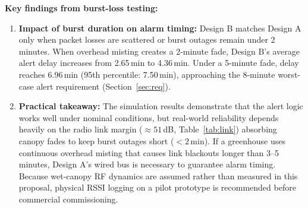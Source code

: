 \documentclass[11pt,a4paper]{report}
\begin{document}
\textbf{Key findings from burst-loss testing:}
\begin{enumerate}
  \item \textbf{Impact of burst duration on alarm timing:} Design B matches Design A only when packet losses are scattered or burst outages remain under 2 minutes. When overhead misting creates a 2-minute fade, Design B's average alert delay increases from 2.65\,min to 4.36\,min. Under a 5-minute fade, delay reaches 6.96\,min (95th percentile: 7.50\,min), approaching the 8-minute worst-case alert requirement (Section~\ref{sec:req}).
  \item \textbf{Practical takeaway:} The simulation results demonstrate that the alert logic works well under nominal conditions, but real-world reliability depends heavily on the radio link margin ($\approx 51$\,dB, Table~\ref{tab:link}) absorbing canopy fades to keep burst outages short ($<2$\,min). If a greenhouse uses continuous overhead misting that causes link blackouts longer than 3--5 minutes, Design A's wired bus is necessary to guarantee alarm timing. Because wet-canopy RF dynamics are assumed rather than measured in this proposal, physical RSSI logging on a pilot prototype is recommended before commercial commissioning.
\end{enumerate}

\end{document}
